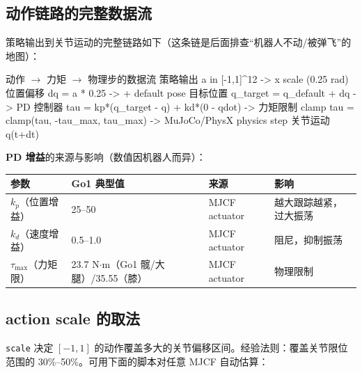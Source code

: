 \subsection{动作链路的完整数据流}
\label{sec:rlmc-ql-action-trace}

策略输出到关节运动的完整链路如下（这条链是后面排查“机器人不动/被弹飞”的地图）：

\begin{codebox}{动作 $\to$ 力矩 $\to$ 物理步的数据流}
策略输出 a in [-1,1]^12
  -> x scale (0.25 rad)        位置偏移 dq = a * 0.25
  -> + default pose            目标位置 q_target = q_default + dq
  -> PD 控制器                  tau = kp*(q_target - q) + kd*(0 - qdot)
  -> 力矩限制 clamp             tau = clamp(tau, -tau_max, tau_max)
  -> MuJoCo/PhysX physics step  关节运动 q(t+dt)
\end{codebox}

\textbf{PD 增益}的来源与影响（数值因机器人而异）：

\begin{center}
\small
\begin{tabular}{@{}llll@{}}
\toprule
参数 & Go1 典型值 & 来源 & 影响 \\
\midrule
$k_p$（位置增益） & 25--50 & MJCF actuator & 越大跟踪越紧，过大振荡 \\
$k_d$（速度增益） & 0.5--1.0 & MJCF actuator & 阻尼，抑制振荡 \\
$\tau_{\max}$（力矩限） & 23.7 N$\cdot$m（Go1 髋/大腿）/35.55（膝） & MJCF actuator & 物理限制 \\
\bottomrule
\end{tabular}
\end{center}


\subsection{action scale 的取法}
\label{sec:rlmc-ql-action-scale}

\verb|scale| 决定 $[-1,1]$ 的动作覆盖多大的关节偏移区间。经验法则：覆盖关节限位范围的 30\%--50\%。可用下面的脚本对任意 MJCF 自动估算：

